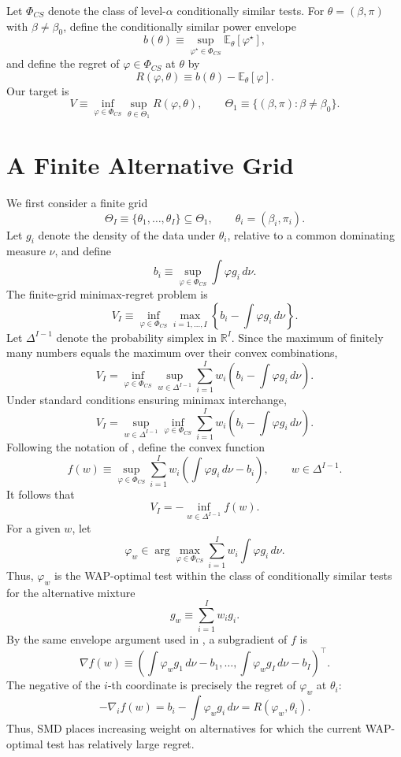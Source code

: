 \documentclass{article}
\theoremstyle{definition}
\theoremstyle{plain}
\theoremstyle{remark}
\begin{document}
Let \(\Phi_{CS}\) denote the class of level-\(\alpha\) conditionally similar tests. For \(\theta=(\beta,\pi)\) with \(\beta\neq\beta_0\), define the conditionally similar power envelope
\[b(\theta)\equiv \sup_{\varphi^\star\in\Phi_{CS}}\mathbb{E}_{\theta}[\varphi^\star],\]
and define the regret of \(\varphi\in\Phi_{CS}\) at \(\theta\) by
\[R(\varphi,\theta)\equiv b(\theta)-\mathbb{E}_{\theta}[\varphi].\]
Our target is
\[V\equiv \inf_{\varphi\in\Phi_{CS}}\sup_{\theta\in\Theta_1}R(\varphi,\theta),\qquad \Theta_1\equiv\{(\beta,\pi):\beta\neq\beta_0\}.\]

\section{A Finite Alternative Grid}

We first consider a finite grid
\[\Theta_I\equiv\{\theta_1,\ldots,\theta_I\}\subseteq\Theta_1,\qquad \theta_i=(\beta_i,\pi_i).\]
Let \(g_i\) denote the density of the data under \(\theta_i\), relative to a common dominating measure \(\nu\), and define
\[b_i\equiv\sup_{\varphi\in\Phi_{CS}}\int\varphi g_i\,d\nu.\]
The finite-grid minimax-regret problem is
\[V_I\equiv\inf_{\varphi\in\Phi_{CS}}\max_{i=1,\ldots,I}\left\{b_i-\int\varphi g_i\,d\nu\right\}.\]
Let \(\Delta^{I-1}\) denote the probability simplex in \(\mathbb{R}^I\). Since the maximum of finitely many numbers equals the maximum over their convex combinations,
\[V_I=\inf_{\varphi\in\Phi_{CS}}\sup_{w\in\Delta^{I-1}}\sum_{i=1}^Iw_i\left(b_i-\int\varphi g_i\,d\nu\right).\]
Under standard conditions ensuring minimax interchange,
\[V_I=\sup_{w\in\Delta^{I-1}}\inf_{\varphi\in\Phi_{CS}}\sum_{i=1}^Iw_i\left(b_i-\int\varphi g_i\,d\nu\right).\]
Following the notation of \cite{aradillas2025approximate}, define the convex function
\[f(w)\equiv\sup_{\varphi\in\Phi_{CS}}\sum_{i=1}^Iw_i\left(\int\varphi g_i\,d\nu-b_i\right),\qquad w\in\Delta^{I-1}.\]
It follows that
\[V_I=-\inf_{w\in\Delta^{I-1}}f(w).\]
For a given \(w\), let
\[\varphi_w\in\arg\max_{\varphi\in\Phi_{CS}}\sum_{i=1}^Iw_i\int\varphi g_i\,d\nu.\]
Thus, \(\varphi_w\) is the WAP-optimal test within the class of conditionally similar tests for the alternative mixture
\[g_w\equiv\sum_{i=1}^Iw_i g_i.\]
By the same envelope argument used in \cite{aradillas2025approximate}, a subgradient of \(f\) is
\[\nabla f(w)\equiv\left(\int\varphi_w g_1\,d\nu-b_1,\ldots,\int\varphi_w g_I\,d\nu-b_I\right)^\top.\]
The negative of the \(i\)-th coordinate is precisely the regret of \(\varphi_w\) at \(\theta_i\):
\[-\nabla_i f(w)=b_i-\int\varphi_w g_i\,d\nu=R(\varphi_w,\theta_i).\]
Thus, SMD places increasing weight on alternatives for which the current WAP-optimal test has relatively large regret.
\end{document}
